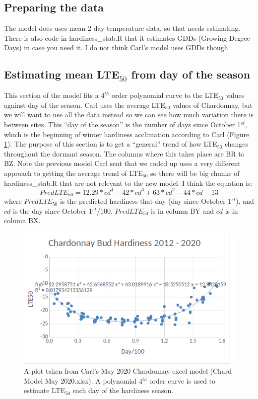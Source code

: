 \documentclass[11pt,letter]{article}
\begin{document}
\subsection{Preparing the data}
The model does uses mean 2 day temperature data, so that needs estimating. There is also code in hardiness\_stab.R that it estimates GDDs (Growing Degree Days) in case you need it. I do not think Carl's model uses GDDs though. 

\subsection{Estimating mean LTE$_{50}$ from day of the season}
This section of the model fits a 4$^{th}$ order polynomial curve to the LTE$_{50}$ values against day of the season. Carl uses the average LTE$_{50}$ values of Chardonnay, but we will want to use all the data instead so we can see how much variation there is between sites. This ``day of the season'' is the number of days since October 1$^{st}$, which is the beginning of winter hardiness acclimation according to Carl (Figure \ref{fig:LTEperDay}). The purpose of this section is to get a ``general'' trend of how LTE$_{50}$ changes throughout the dormant season. The columns where this takes place are BR to BZ. Note the previous model Carl sent that we coded up uses a very different approach to getting the average trend of LTE$_{50}$ so there will be big chunks of hardiness\_stab.R that are not relevant to the new model. I think the equation is:
\begin{equation*}
PredLTE_{50} = 12.29*cd^{4} - 42*cd^{3} + 63*cd^{2} - 44*cd - 13
\end{equation*}
where $PredLTE_{50}$ is the predicted hardiness that day (day since October 1$^{st}$), and $cd$ is the day since October 1$^{st}$/100. $PredLTE_{50}$  is in column BY and $cd$ is in column BX. \\
  
\begin{figure}[H]
  \includegraphics[width=\linewidth]{FiguredLTEday.png}
  \caption{A plot taken from Carl's May 2020 Chardonnay excel model (Chard Model May 2020.xlsx). A polynomial 4$^{th}$ order curve is used to estimate LTE$_{50}$ each day of the hardiness season.}
  \label{fig:LTEperDay}
\end{figure}
\end{document}

